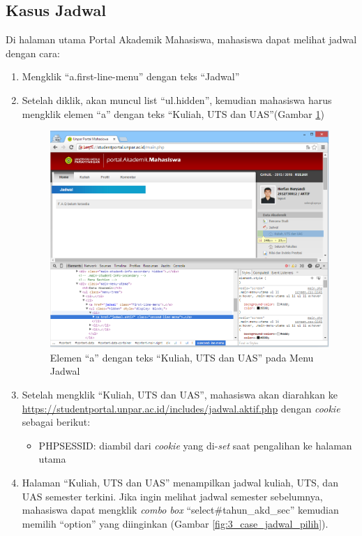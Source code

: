 \subsection{Kasus Jadwal}
Di halaman utama Portal Akademik Mahasiswa, mahasiswa dapat melihat jadwal dengan cara:
\begin{enumerate}
	\item Mengklik ``a.first-line-menu'' dengan teks ``Jadwal'' 
	\item Setelah diklik, akan muncul list ``ul.hidden'', kemudian mahasiswa harus mengklik elemen ``a'' dengan teks ``Kuliah, UTS dan UAS''(Gambar \ref{fig:3_case_jadwal_menu})
	\begin{figure}[H]
			\centering
			\includegraphics[scale=0.5]{Gambar/case-jadwal-menu}
			\caption{Elemen ``a'' dengan teks ``Kuliah, UTS dan UAS'' pada Menu Jadwal} 
			\label{fig:3_case_jadwal_menu}
		\end{figure}
		\item Setelah mengklik ``Kuliah, UTS dan UAS'', mahasiswa akan diarahkan ke \url{https://studentportal.unpar.ac.id/includes/jadwal.aktif.php} dengan \textit{cookie} sebagai berikut:
\begin{itemize}
	\item PHPSESSID: diambil dari \textit{cookie} yang di-\textit{set} saat pengalihan ke halaman utama
\end{itemize}
\item Halaman ``Kuliah, UTS dan UAS'' menampilkan jadwal kuliah, UTS, dan UAS semester terkini. Jika ingin melihat jadwal semester sebelumnya, mahasiswa dapat mengklik \textit{combo box} ``select\#tahun\_akd\_sec'' kemudian memilih ``option'' yang diinginkan (Gambar \ref{fig:3_case_jadwal_pilih}).
		

\end{enumerate}

